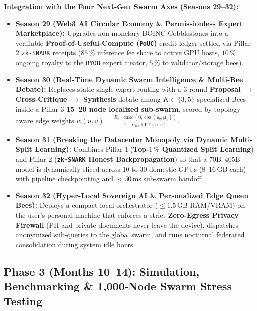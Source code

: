 \documentclass[11pt,a4paper]{article}
\begin{document}
\textbf{Integration with the Four Next-Gen Swarm Axes (Seasons 29--32):}
\begin{itemize}[leftmargin=1.8em]
    \item \textbf{Season 29 (Web3 AI Circular Economy \& Permissionless Expert Marketplace):} Upgrades non-monetary BOINC Cobblestones into a verifiable \textbf{Proof-of-Useful-Compute (\texttt{PoUC})} credit ledger settled via Pillar 2 \texttt{zk-SNARK} receipts ($85\,\%$ inference fee share to active GPU hosts, $10\,\%$ ongoing royalty to the \texttt{BYOB} expert creator, $5\,\%$ to validator/storage bees).
    \item \textbf{Season 30 (Real-Time Dynamic Swarm Intelligence \& Multi-Bee Debate):} Replaces static single-expert routing with a 3-round \textbf{Proposal $\to$ Cross-Critique $\to$ Synthesis} debate among $K \in \{3, 5\}$ specialized Bees inside a Pillar 3 \textbf{15--20 node localized sub-swarm}, scored by topology-aware edge weights $w(u,v) = \frac{R_v \cdot \max(0, \cos(\mathbf{e}_q, \boldsymbol{\mu}_v))}{1 + \alpha_{\text{lat}}\,\text{RTT}(u,v)}$.
    \item \textbf{Season 31 (Breaking the Datacenter Monopoly via Dynamic Multi-Split Learning):} Combines Pillar 1 (\textbf{Top-$1\,\%$ Quantized Split Learning}) and Pillar 2 (\textbf{\texttt{zk-SNARK} Honest Backpropagation}) so that a $70\text{B}\text{--}405\text{B}$ model is dynamically sliced across 10 to 30 domestic GPUs (8--16\,GB each) with pipeline checkpointing and $< 50$\,ms sub-swarm handoff.
    \item \textbf{Season 32 (Hyper-Local Sovereign AI \& Personalized Edge Queen Bees):} Deploys a compact local orchestrator ($\le 1.5$\,GB RAM/VRAM) on the user's personal machine that enforces a strict \textbf{Zero-Egress Privacy Firewall} (PII and private documents never leave the device), dispatches anonymized sub-queries to the global swarm, and runs nocturnal federated consolidation during system idle hours.
\end{itemize}

\subsection{Phase 3 (Months 10--14): Simulation, Benchmarking \& 1,000-Node Swarm Stress Testing}
\label{sec:roadmap_phase3}
\end{document}
